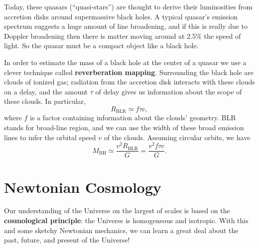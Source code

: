 \documentclass[../a062main.tex]{subfiles}
\begin{document}
Today, these quasars (``quasi-stars'') are thought to derive their luminosities from accretion disks around supermassive black holes.
A typical quasar's emission spectrum suggests a huge amount of line broadening, and if this is really due to Doppler broadening then there is matter moving around at 2.5\% the speed of light.
So the quasar must be a compact object like a black hole.

In order to estimate the mass of a black hole at the center of a quasar we use a clever technique called \textbf{reverberation mapping}.
Surrounding the black hole are clouds of ionized gas; radiation from the accretion disk interacts with these clouds on a delay, and the amount $\tau$ of delay gives us information about the scope of these clouds.
In particular,
\[ R_\textrm{BLR} \simeq f \tau c,  \]
where $f$ is a factor containing information about the clouds' geometry.
BLR stands for broad-line region, and we can use the width of these broad emission lines to infer the orbital speed $v$ of the clouds.
Assuming circular orbits, we have
\[ M_\textrm{BH} \simeq \frac{v^2 R_\textrm{BLR}}{G} = \frac{v^2 f \tau c}{G}. \]

\section{Newtonian Cosmology}
Our understanding of the Universe on the largest of scales is based on the \textbf{cosmological principle}: the Universe is homogeneous and isotropic.
With this and some sketchy Newtonian mechanics, we can learn a great deal about the past, future, and present of the Universe!
\end{document}
